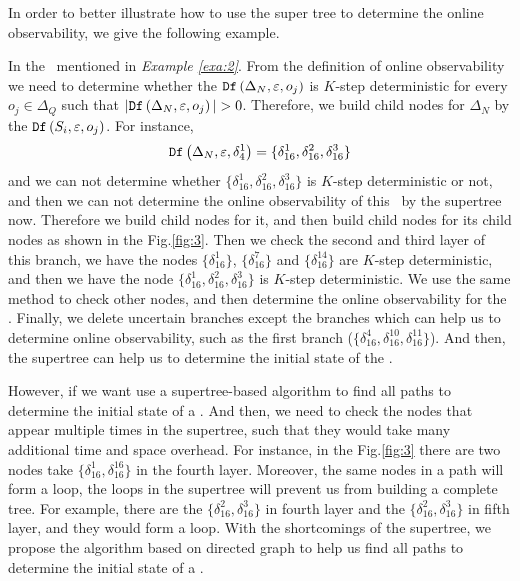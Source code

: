 In order to better illustrate how to use the super tree to determine the online observability, we give the following example.
  
\begin{example}
In the \BCN\ mentioned in {\em Example \ref{exa:2}}. From the definition of online observability we need to determine whether the ${\tt Df}\left(\Delta_N,\varepsilon,o_j\right)$ is $K$-step deterministic for every  $o_j \in \Delta_Q$ such that $|\Ded\left(\Delta_N,\varepsilon, o_j\right)|> 0$. Therefore, we build child nodes for $\Delta_N$ by the ${\tt Df}\left(S_i,\varepsilon, o_j\right)$. For instance, \[{\tt Df}\left(\Delta_N,\varepsilon,\delta_{4}^1\right)=\{\delta_{16}^1,\delta_{16}^2,\delta_{16}^3\}\] and we can not determine whether $\{\delta_{16}^1,\delta_{16}^2,\delta_{16}^3\}$ is $K$-step deterministic or not, and then we can not determine the online observability of this \BCN\ by the supertree now. Therefore we build child nodes for it, and then build child nodes for its child nodes as shown in the Fig.\ref{fig:3}. Then we check the second and third layer of this branch, we have the nodes $\{\delta_{16}^1\}$, $\{\delta_{16}^7\}$ and $\{\delta_{16}^{14}\}$ are $K$-step deterministic, and then we have the node $\{\delta_{16}^1,\delta_{16}^2,\delta_{16}^3\}$ is $K$-step deterministic. We use the same method to check other nodes, and then determine the online observability for the \BCN. Finally, we delete uncertain branches except the branches which can help us to determine online observability, such as the first branch ($\{\delta_{16}^{4},\delta_{16}^{10},\delta_{16}^{11}\}$). And then, the supertree can help us to determine the initial state of the \BCN.%

\end{example}   

However, if we want use a supertree-based algorithm to find all paths to determine the initial state of a \BCN. And then, we need to check the nodes that appear multiple times in the supertree, such that they would take many additional time and space overhead. For instance, in the Fig.\ref{fig:3} there are two nodes take $\{\delta_{16}^1,\delta_{16}^{16}\}$ in the fourth layer. Moreover, the same nodes in a path will form a loop, the loops in the supertree will prevent us from building a complete tree. For example, there are the $\{\delta_{16}^2,\delta_{16}^3\}$ in fourth layer and the $\{\delta_{16}^2,\delta_{16}^3\}$ in fifth layer, and they would form a loop. With the shortcomings of the supertree, we propose the algorithm based on directed graph to help us find all paths to determine the initial state of a \BCN.
